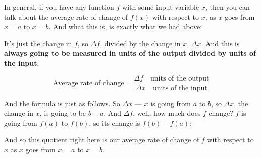 \documentclass[pdftex, brazil, 12pt, twoside]{article}
\begin{document}
In general, if you have any function $f$ with some input
variable $x$, then you can talk about the average rate
of change of $f(x)$ with respect to $x$, as $x$ goes
from $x = a$ to $x = b$. And what this is, is exactly what we had above:

\begin{figure}[H]
  \begin{center}
  \end{center}
\end{figure}

It's just the change in $f$, so $\Delta
f$, divided by the change in $x$, $\Delta x$.
And this is \textbf{always going to be measured
  in units of the output divided by units of the input}:

\begin{equation}
  \text{Average rate of change} = \frac{\Delta f \quad \text{units of the output}}{\Delta x \quad \text{units of the input}}
\end{equation}

And the formula is just as follows.
So $\Delta x$ --- $x$ is going from $a$ to $b$,
so $\Delta x$, the change in $x$, is going to be $b - a$.
And $\Delta f$, well, how much does $f$ change?
$f$ is going from $f(a)$ to $f(b)$, so its change is
$f(b) - f(a)$:

\begin{figure}[H]
  \begin{center}
  \end{center}
\end{figure}

And so this quotient right here is our average rate
of change of $f$ with respect to $x$ as $x$ goes from $x = a$
to $x = b$.
\end{document}
